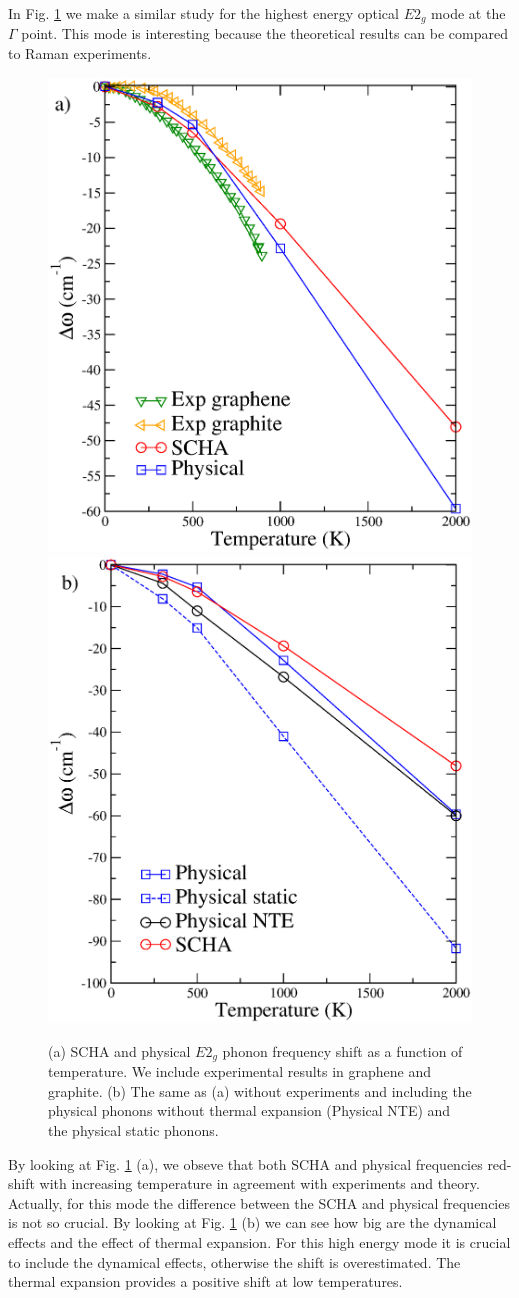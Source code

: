 In Fig. \ref{e2g} we make a similar study for the highest energy optical $E2_{g}$ mode at the $\Gamma$ point. This 
mode is interesting because the theoretical results can be compared to Raman experiments\cite{linas2015interplay}. 
\begin{figure}[ht]
\includegraphics[width=0.49\linewidth]{Figures/e2g1.eps}
\includegraphics[width=0.49\linewidth]{Figures/e2g2.eps}
	\caption[E2g mode temperature dependent frequency shift]{(a) SCHA and physical $E2_{g}$ phonon frequency 
	shift as a function of temperature. We include experimental results in graphene\cite{linas2015interplay} and 
	graphite\cite{kagi1994proper,tan1999intrinsic}. (b) The same as (a) without experiments and including the 
	physical phonons without thermal expansion (Physical NTE) and the physical static phonons.}
\label{e2g}
\end{figure}
By looking at Fig. \ref{e2g} (a), we obseve that both SCHA and physical frequencies red-shift with increasing 
temperature in agreement with experiments and theory\cite{calizo2007temperature,bonini2007phonon}. Actually, for 
this mode the difference between the SCHA and physical frequencies is not so crucial. By looking at Fig. \ref{e2g} 
(b) we can see how big are the dynamical effects and the effect of thermal expansion. For this high energy mode it 
is crucial to include the dynamical effects, otherwise the shift is overestimated. The thermal expansion provides 
a positive shift at low temperatures. 

